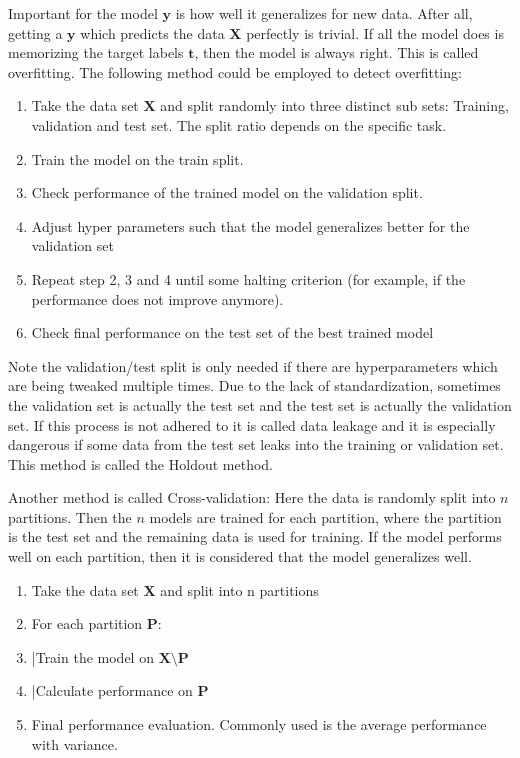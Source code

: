 \documentclass[draft,final,oneside]{vutinfth} %
\begin{document}
Important for the model $\boldsymbol{y}$ is how well it generalizes for new data. After all, getting a $\boldsymbol{y}$ which predicts the data $\boldsymbol{X}$ perfectly is trivial. If all the model does is memorizing the target labels $\boldsymbol{t}$, then the model is always right. This is called overfitting. The following method could be employed to detect overfitting:

\begin{enumerate}
\item Take the data set $\boldsymbol{X}$ and split randomly into three distinct sub sets: Training, validation and test set. The split ratio depends on the specific task.
\item Train the model on the train split.
\item Check performance of the trained model on the validation split.
\item Adjust hyper parameters such that the model generalizes better for the validation set
\item Repeat step 2, 3 and 4 until some halting criterion (for example, if the performance does not improve anymore).
\item Check final performance on the test set of the best trained model
\end{enumerate}
Note the validation/test split is only needed if there are hyperparameters which are being tweaked multiple times.
Due to the lack of standardization, sometimes the validation set is actually the test set and the test set is actually the validation set.
If this process is not adhered to it is called data leakage and it is especially dangerous if some data from the test set leaks into the training or validation set. 
This method is called the Holdout method. 


Another method is called Cross-validation: Here the data is randomly split into $n$ partitions. Then the $n$ models are trained for each partition, where the partition is the test set and the remaining data is used for training. If the model performs well on each partition, then it is considered that the model generalizes well.

\begin{enumerate}
\item Take the data set $\boldsymbol{X}$ and split into n partitions
\item For each partition $\boldsymbol{P}$:
\item |\quad Train the model on $\boldsymbol{X} \setminus \boldsymbol{P}$
\item |\quad Calculate performance on $\boldsymbol{P}$
\item Final performance evaluation. Commonly used is the average performance with variance.
\end{enumerate}
\end{document}
